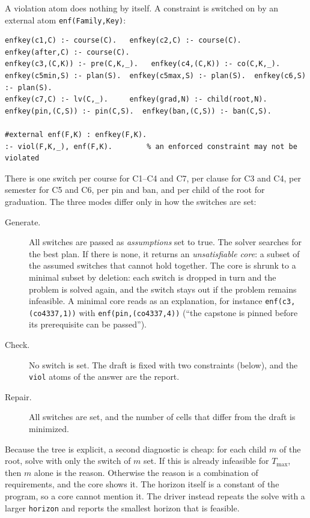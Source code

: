\documentclass[10pt,a4paper]{article}
\begin{document}
A violation atom does nothing by itself. A constraint is switched on by an
external atom \texttt{enf(Family,Key)}:
\begin{lstlisting}
enfkey(c1,C) :- course(C).   enfkey(c2,C) :- course(C).   enfkey(after,C) :- course(C).
enfkey(c3,(C,K)) :- pre(C,K,_).   enfkey(c4,(C,K)) :- co(C,K,_).
enfkey(c5min,S) :- plan(S).  enfkey(c5max,S) :- plan(S).  enfkey(c6,S) :- plan(S).
enfkey(c7,C) :- lv(C,_).     enfkey(grad,N) :- child(root,N).
enfkey(pin,(C,S)) :- pin(C,S).  enfkey(ban,(C,S)) :- ban(C,S).
 
#external enf(F,K) : enfkey(F,K).
:- viol(F,K,_), enf(F,K).        % an enforced constraint may not be violated
\end{lstlisting}
There is one switch per course for C1--C4 and C7, per clause for C3 and C4, per
semester for C5 and C6, per pin and ban, and per child of the root for
graduation. The three modes differ only in how the switches are set:
\begin{description}
  \item[Generate.] All switches are passed as \emph{assumptions} set to true.
        The solver searches for the best plan. If there is none, it returns an
        \emph{unsatisfiable core}: a subset of the assumed switches that
        cannot hold together. The core is shrunk to a minimal subset by
        deletion: each switch is dropped in turn and the problem is solved
        again, and the switch stays out if the problem remains infeasible.
        A minimal core reads as an explanation, for instance
        \texttt{enf(c3,(co4337,1))} with \texttt{enf(pin,(co4337,4))}
        (``the capstone is pinned before its prerequisite can be passed'').
  \item[Check.] No switch is set. The draft is fixed with two constraints
        (below), and the \texttt{viol} atoms of the answer are the report.
  \item[Repair.] All switches are set, and the number of cells that differ
        from the draft is minimized.
\end{description}
Because the tree is explicit, a second diagnostic is cheap: for each child
$m$ of the root, solve with only the switch of $m$ set. If this is already
infeasible for $T_{\max}$, then $m$ alone is the reason. Otherwise the reason
is a combination of requirements, and the core shows it. The horizon itself is
a constant of the program, so a core cannot mention it. The driver instead
repeats the solve with a larger \texttt{horizon} and reports the smallest
horizon that is feasible.
 
\end{document}
